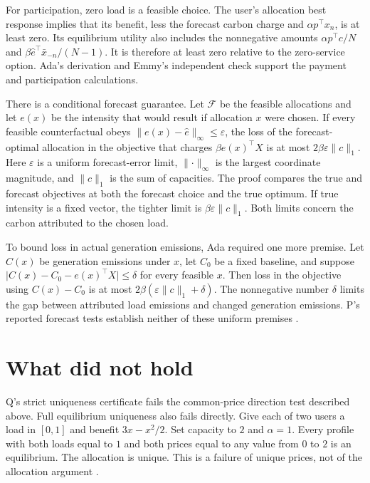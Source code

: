 \documentclass{article}
\begin{document}
For participation, zero load is a feasible choice. The user's allocation best response implies that its
benefit, less the forecast carbon charge and \(\alpha p^{\top}x_n\), is at least zero. Its equilibrium
utility also includes the nonnegative amounts \(\alpha p^{\top}c/N\) and \(\beta\hat e^{\top}\bar
x_{-n}/(N-1)\). It is therefore at least zero relative to the zero-service option. Ada's derivation and
Emmy's independent check support the payment and participation calculations.

There is a conditional forecast guarantee. Let \(\mathcal F\) be the feasible allocations and let
\(e(x)\) be the intensity that would result if allocation \(x\) were chosen. If every feasible
counterfactual obeys \(\lVert e(x)-\hat e\rVert_\infty\leq\varepsilon\), the loss of the forecast-optimal
allocation in the objective that charges \(\beta e(x)^{\top}X\) is at most \(2\beta\varepsilon\lVert
c\rVert_1\). Here \(\varepsilon\) is a uniform forecast-error limit, \(\lVert\cdot\rVert_\infty\) is the
largest coordinate magnitude, and \(\lVert c\rVert_1\) is the sum of capacities. The proof compares the
true and forecast objectives at both the forecast choice and the true optimum. If true intensity is a
fixed vector, the tighter limit is \(\beta\varepsilon\lVert c\rVert_1\). Both limits concern the carbon
attributed to the chosen load.

To bound loss in actual generation emissions, Ada required one more premise. Let \(C(x)\) be generation
emissions under \(x\), let \(C_0\) be a fixed baseline, and suppose \(\lvert
C(x)-C_0-e(x)^{\top}X\rvert\leq\delta\) for every feasible \(x\). Then loss in the objective using
\(C(x)-C_0\) is at most \(2\beta(\varepsilon\lVert c\rVert_1+\delta)\). The nonnegative number \(\delta\)
limits the gap between attributed load emissions and changed generation emissions. P's reported forecast
tests establish neither of these uniform premises \cite{P}.

\section{What did not hold}

Q's strict uniqueness certificate fails the common-price direction test described above. Full equilibrium
uniqueness also fails directly. Give each of two users a load in \([0,1]\) and benefit \(3x-x^2/2\). Set
capacity to \(2\) and \(\alpha=1\). Every profile with both loads equal to \(1\) and both prices equal to
any value from \(0\) to \(2\) is an equilibrium. The allocation is unique. This is a failure of unique
prices, not of the allocation argument \cite{Q}.
\end{document}
